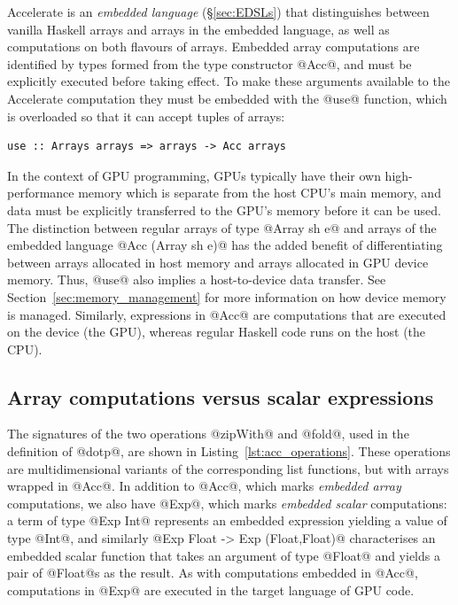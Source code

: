 Accelerate is an \emph{embedded language}\lang[embedded]{} (\S\ref{sec:EDSLs})
that distinguishes between vanilla Haskell arrays and arrays in the embedded
language, as well as computations on both flavours of arrays. Embedded array
computations are identified by types formed from the type constructor @Acc@, and
must be explicitly executed before taking effect. To make these arguments
available to the Accelerate computation they must be embedded with the @use@
function, which is overloaded so that it can accept tuples of arrays:
%
\begin{lstlisting}[style=haskell]
use :: Arrays arrays => arrays -> Acc arrays
\end{lstlisting}
%
In the context of GPU\gpu{} programming, GPUs typically have their own
high-performance memory which is separate from the host CPU's main memory, and
data must be explicitly transferred to the GPU's memory before it can be used.
The distinction between regular arrays of type @Array sh e@ and arrays of the
embedded language @Acc (Array sh e)@ has the added benefit of differentiating
between arrays allocated in host memory and arrays allocated in GPU device
memory. Thus, @use@ also implies a host-to-device data transfer. See
Section~\ref{sec:memory_management} for more information on how device memory is
managed. Similarly, expressions in @Acc@ are computations that are executed on
the device (the GPU), whereas regular Haskell code runs on the host (the CPU).


\subsection{Array computations versus scalar expressions}
\label{sec:array_computations_vs_scalar_expressions}

The signatures of the two operations @zipWith@ and @fold@, used in the
definition of @dotp@, are shown in Listing~\ref{lst:acc_operations}. These
operations are multidimensional variants of the corresponding list functions,
but with arrays wrapped in @Acc@. In addition to @Acc@, which marks \emph{embedded
array}\lang[embedded]{} computations, we also have @Exp@, which marks
\emph{embedded scalar} computations: a term of type @Exp Int@ represents an
embedded expression yielding a value of type @Int@, and similarly
@Exp Float -> Exp (Float,Float)@ characterises an embedded scalar function that
takes an argument of type @Float@ and yields a pair of @Float@s as the result.
As with computations embedded in @Acc@, computations in @Exp@ are executed in
the target language of GPU\gpu{} code.

